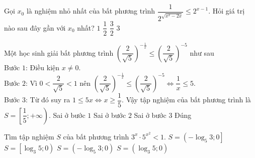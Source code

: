 \begin{ex}%
	Gọi $x_0$ là nghiệm nhỏ nhất của bất phương trình $\dfrac{1}{2^{\sqrt{x^2-2x}}}\leq 2^{x-1}$. Hỏi giá trị nào sau đây gần với $x_0$ nhất?
	\choice
	{$1$}
	{$\dfrac{1}{2}$}
	{\True $\dfrac{3}{2}$}
	{$3$}
\end{ex}
\begin{ex}%
	Một học sinh giải bất phương trình $\left(\dfrac{2}{\sqrt{5}}\right)^{-\tfrac{1}{x}}\leq\left(\dfrac{2}{\sqrt{5}}\right)^{-5}$ như sau\\
	Bước $1$: Điều kiện $x\neq 0$.\\
	Bước $2$: Vì $0<\dfrac{2}{\sqrt{5}}<1$ nên $\left(\dfrac{2}{\sqrt{5}}\right)^{-\tfrac{1}{x}}\leq\left(\dfrac{2}{\sqrt{5}}\right)^{-5}\Leftrightarrow\dfrac{1}{x}\leq 5$.\\
	Bước 3: Từ đó suy ra $1\leq 5x\Leftrightarrow x\geq\dfrac{1}{5}$. Vậy tập nghiệm của bất phương trình là $S=\left[\dfrac{1}{5};+\infty\right)$. 
	\choice
	{Sai ở bước $1$}
	{Sai ở bước $2$}
	{\True Sai ở bước $3$}
	{Đúng}
	\loigiai{
		Ở bước $3$: Từ $\dfrac{1}{x}\leq 5\Leftrightarrow\dfrac{1-5x}{x}\leq 0\Leftrightarrow\hoac{&x<0\\&x\geq\dfrac{1}{5}}\Rightarrow S=(-\infty;0)\cup\left[\dfrac{1}{5};+\infty\right)$.\\
		Vậy sai ở bước $3$.}
\end{ex}
\begin{ex}%
	Tìm tập nghiệm $S$ của bất phương trình $3^x\cdot 5^{x^2}<1$. 
	\choice
	{$S=\left(-\log_5 3;0\right]$}
	{$S=\left[\log_3 5;0\right)$}
	{\True $S=\left(-\log_5 3;0\right)$}
	{$S=(\log_3 5;0)$}
\end{ex}
